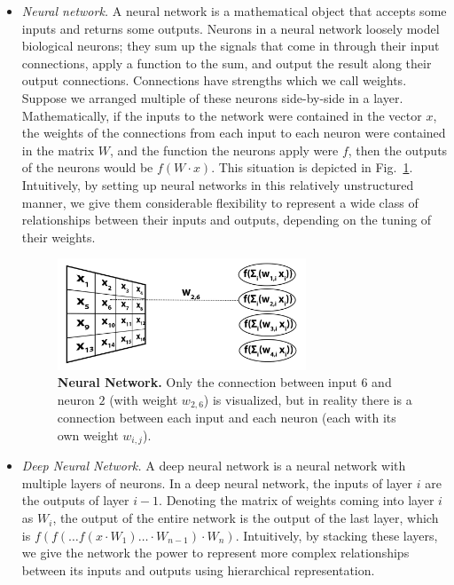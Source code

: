 \documentclass[10pt,letterpaper]{article}
\begin{document}
            \begin{itemize}
                \item
                    \textit{Neural network.} A neural network is a mathematical object that accepts some inputs and returns some outputs. Neurons in a neural network loosely model biological neurons; they sum up the signals that come in through their input connections, apply a function to the sum, and output the result along their output connections. Connections have strengths which we call weights. Suppose we arranged multiple of these neurons side-by-side in a layer. Mathematically, if the inputs to the network were contained in the vector $x$, the weights of the connections from each input to each neuron were contained in the matrix $W$, and the function the neurons apply were $f$, then the outputs of the neurons would be $f(W \cdot x)$. This situation is depicted in Fig.~\ref{dcnn_neural_network}. Intuitively, by setting up neural networks in this relatively unstructured manner, we give them considerable flexibility to represent a wide class of relationships between their inputs and outputs, depending on the tuning of their weights.
            
                    \begin{figure}[h]
                        \graphicspath{{results/derived/}}
                        \includegraphics[width=0.7\textwidth]{dcnn_neural_net}
                        \caption{{\bf Neural Network.} Only the connection between input $6$ and neuron $2$ (with weight $w_{2, 6}$) is visualized, but in reality there is a connection between each input and each neuron (each with its own weight $w_{i, j}$).}
                        \label{dcnn_neural_network}
                    \end{figure}
            
                \item
                    \textit{Deep Neural Network.} A deep neural network is a neural network with multiple layers of neurons. In a deep neural network, the inputs of layer $i$ are the outputs of layer $i - 1$. Denoting the matrix of weights coming into layer $i$ as $W_i$, the output of the entire network is the output of the last layer, which is $f(f(\ldots f(x \cdot W_1) \ldots \cdot W_{n-1}) \cdot W_n)$. Intuitively, by stacking these layers, we give the network the power to represent more complex relationships between its inputs and outputs using hierarchical representation.
            

\end{itemize}
\end{document}
